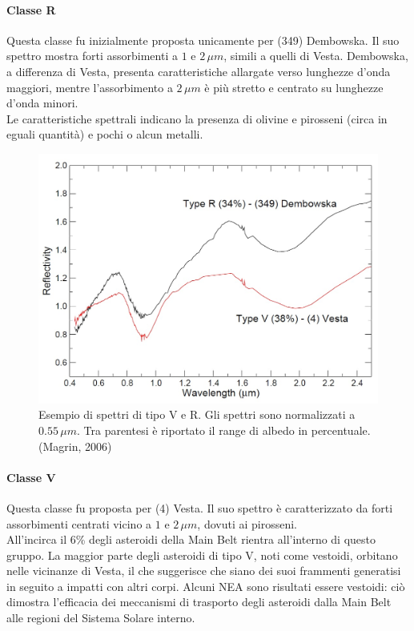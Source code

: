 \documentclass[a4paper,11pt,openright]{book}
\begin{document}
\paragraph*{Classe R}
Questa classe fu inizialmente proposta unicamente per (349) Dembowska. Il suo spettro mostra forti assorbimenti a $1$ e $2\,\mu m$, simili a quelli di Vesta. Dembowska, a differenza di Vesta, presenta caratteristiche allargate verso lunghezze d'onda maggiori, mentre l'assorbimento a $2\,\mu m$ è più stretto e centrato su lunghezze d'onda minori.\\
Le caratteristiche spettrali indicano la presenza di olivine e pirosseni (circa in eguali quantità) e pochi o alcun metalli. 

\begin{figure}
    \centering
    \includegraphics[scale=0.3]{figure/spettro_rv.jpg}
    \caption[Esempio di spettri di tipo V e R.]{Esempio di spettri di tipo V e R. Gli spettri sono normalizzati a $0.55\,\mu m$. Tra parentesi è riportato il range di albedo in percentuale. (Magrin, 2006)}
    \label{spettro_rv}
\end{figure}

\paragraph*{Classe V}
Questa classe fu proposta per (4) Vesta. Il suo spettro è caratterizzato da forti assorbimenti centrati vicino a $1$ e $2\,\mu m$, dovuti ai pirosseni.\\
All'incirca il 6\% degli asteroidi della Main Belt rientra all'interno di questo gruppo. La maggior parte degli asteroidi di tipo V, noti come vestoidi, orbitano nelle vicinanze di Vesta, il che suggerisce che siano dei suoi frammenti generatisi in seguito a impatti con altri corpi. Alcuni NEA sono risultati essere vestoidi: ciò dimostra l'efficacia dei meccanismi di trasporto degli asteroidi dalla Main Belt alle regioni del Sistema Solare interno.
\end{document}
